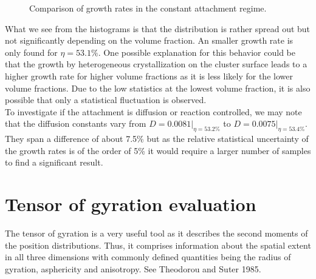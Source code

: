 \begin{figure}[h]
\begin{center}
 \hspace{0.5cm}
\caption[Constant attachment rate measurements from production data]{Comparison of growth rates in the constant attachment regime.}
\label{fig:constant_growth_rates}
\end{center}
\end{figure}

What we see from the histograms is that the distribution is rather spread out but not significantly depending on the volume fraction. An smaller growth rate is only found for $\eta = 53.1\%$. One possible explanation for this behavior could be that the growth by heterogeneous crystallization on the cluster surface leads to a higher growth rate for higher volume fractions as it is less likely for the lower volume fractions. Due to the low statistics at the lowest volume fraction, it is also possible that only a statistical fluctuation is observed.\\ 
To investigate if the attachment is diffusion or reaction controlled, we may note that the diffusion constants vary from $D=0.0081|_{\eta = 53.2\%}$ to $D=0.0075|_{\eta = 53.4\%}$. They span a difference of about 7.5\% but as the relative statistical uncertainty of the growth rates is of the order of 5\% it would require a larger number of samples to find a significant result.

\section{Tensor of gyration evaluation}
\label{sec:tog}
The tensor of gyration is a very useful tool as it describes the second moments of the position distributions. Thus, it comprises information about the spatial extent in all three dimensions with commonly defined quantities being the radius of gyration, asphericity and anisotropy. See Theodorou and Suter 1985\cite{Theodorou1985}.\\

